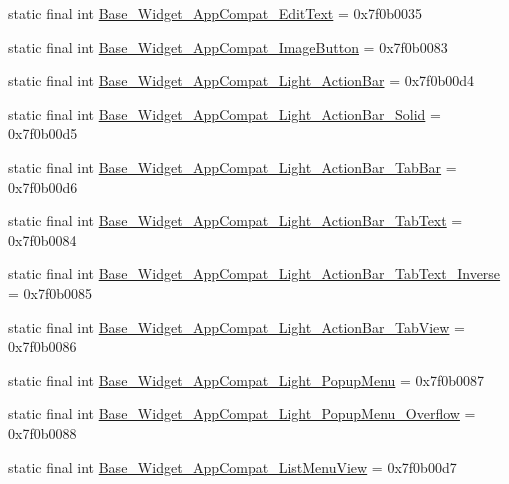 \begin{CompactItemize}
\item 
static final int \hyperlink{classandroid_1_1support_1_1graphics_1_1drawable_1_1animated_1_1_r_1_1style_680aeceb5f826bb1b7d6a1f4f9b9934c}{Base\_\-Widget\_\-AppCompat\_\-EditText} = 0x7f0b0035
\item 
static final int \hyperlink{classandroid_1_1support_1_1graphics_1_1drawable_1_1animated_1_1_r_1_1style_746ae2ceb031933aac8640d4da591e6f}{Base\_\-Widget\_\-AppCompat\_\-ImageButton} = 0x7f0b0083
\item 
static final int \hyperlink{classandroid_1_1support_1_1graphics_1_1drawable_1_1animated_1_1_r_1_1style_ab55cec437501435567ad1766d161f49}{Base\_\-Widget\_\-AppCompat\_\-Light\_\-ActionBar} = 0x7f0b00d4
\item 
static final int \hyperlink{classandroid_1_1support_1_1graphics_1_1drawable_1_1animated_1_1_r_1_1style_08f97602df2fcc5b6e2b4abb7c0dc2cf}{Base\_\-Widget\_\-AppCompat\_\-Light\_\-ActionBar\_\-Solid} = 0x7f0b00d5
\item 
static final int \hyperlink{classandroid_1_1support_1_1graphics_1_1drawable_1_1animated_1_1_r_1_1style_937d8276f005e31d85674b94ee94066d}{Base\_\-Widget\_\-AppCompat\_\-Light\_\-ActionBar\_\-TabBar} = 0x7f0b00d6
\item 
static final int \hyperlink{classandroid_1_1support_1_1graphics_1_1drawable_1_1animated_1_1_r_1_1style_556a70d3a8df1e593ada728c7d132de5}{Base\_\-Widget\_\-AppCompat\_\-Light\_\-ActionBar\_\-TabText} = 0x7f0b0084
\item 
static final int \hyperlink{classandroid_1_1support_1_1graphics_1_1drawable_1_1animated_1_1_r_1_1style_603a9f549e78511532b238ec8b3cdd64}{Base\_\-Widget\_\-AppCompat\_\-Light\_\-ActionBar\_\-TabText\_\-Inverse} = 0x7f0b0085
\item 
static final int \hyperlink{classandroid_1_1support_1_1graphics_1_1drawable_1_1animated_1_1_r_1_1style_53fc255ff3ab489851996111b6e31eb1}{Base\_\-Widget\_\-AppCompat\_\-Light\_\-ActionBar\_\-TabView} = 0x7f0b0086
\item 
static final int \hyperlink{classandroid_1_1support_1_1graphics_1_1drawable_1_1animated_1_1_r_1_1style_9b94355cadbaaf4dabfa931efa5c6c50}{Base\_\-Widget\_\-AppCompat\_\-Light\_\-PopupMenu} = 0x7f0b0087
\item 
static final int \hyperlink{classandroid_1_1support_1_1graphics_1_1drawable_1_1animated_1_1_r_1_1style_a011830b13746bc98525dd0edb21053c}{Base\_\-Widget\_\-AppCompat\_\-Light\_\-PopupMenu\_\-Overflow} = 0x7f0b0088
\item 
static final int \hyperlink{classandroid_1_1support_1_1graphics_1_1drawable_1_1animated_1_1_r_1_1style_8632cb68bfac899837a719bcb0e05630}{Base\_\-Widget\_\-AppCompat\_\-ListMenuView} = 0x7f0b00d7

\end{CompactItemize}

